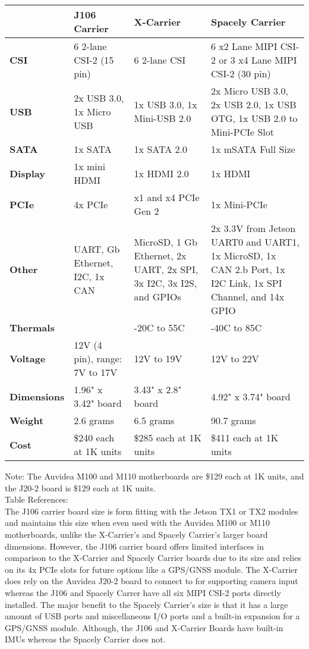 \documentclass[letterpaper,10pt,serif,draftclsnofoot,onecolumn,compsoc,titlepage]{IEEEtran}
\begin{document}
\begin{tabular}{|l|p{5cm}|p{5cm}|p{5cm}|}
	\hline
	\textbf{} & \textbf{J106 Carrier} & \textbf{X-Carrier} & \textbf{Spacely Carrier}\\
	\hline
	\textbf{CSI} & 6 2-lane CSI-2 (15 pin) & 6 2-lane CSI & 6 x2 Lane MIPI CSI-2 or 3 x4 Lane MIPI CSI-2 (30 pin)\\
	\hline
	\textbf{USB} & 2x USB 3.0, 1x Micro USB & 1x USB 3.0, 1x Mini-USB 2.0 & 2x Micro USB 3.0, 2x USB 2.0, 1x USB OTG, 1x USB 2.0 to Mini-PCIe Slot \\
	\hline
	\textbf{SATA} & 1x SATA & 1x SATA 2.0 & 1x mSATA Full Size \\
	\hline
	\textbf{Display} & 1x mini HDMI & 1x HDMI 2.0 & 1x HDMI \\
	\hline
	\textbf{PCIe} & 4x PCIe & x1 and x4 PCIe Gen 2 & 1x Mini-PCIe \\
	\hline
	\textbf{Other} & UART, Gb Ethernet, I2C, 1x CAN & MicroSD, 1 Gb Ethernet, 2x UART, 2x SPI, 3x I2C, 3x I2S, and GPIOs & 2x 3.3V from Jetson UART0 and UART1, 1x MicroSD, 1x CAN 2.b Port, 1x I2C Link, 1x SPI Channel, and 14x GPIO \\
	\hline
	\textbf{Thermals} &  & -20\degree C to 55\degree C & -40\degree C to 85\degree C \\
	\hline
	\textbf{Voltage} & 12V (4 pin), range: 7V to 17V & 12V to 19V & 12V to 22V \\
	\hline
	\textbf{Dimensions} & 1.96" x 3.42" board & 3.43" x 2.8" board & 4.92" x 3.74" board \\
	\hline
	\textbf{Weight} & 2.6 grams & 6.5 grams & 90.7 grams \\
	\hline
	\textbf{Cost} & \$240 each at 1K units & \$285 each at 1K units & \$411 each at 1K units \\
	\hline
\end{tabular}	
\newline
\newline
\newline
Note: The Auvidea M100 and M110 motherboards are \$129 each at 1K units, and the 
J20-2 board is \$129 each at 1K units. \\
Table References: \cite{AuvideaJ106, MouserJ106, CEIX, CEIXpdf, SpacelyUG, SpacelyQuote, CEIQuote, AuvideaQuote}\\

The J106 carrier board size is form fitting with the Jetson TX1 or TX2 modules and 
maintains this size when even used with the Auvidea M100 or M110 motherboards, unlike 
the X-Carrier's and Spacely Carrier's larger board dimensions. However, the J106 carrier board 
offers limited interfaces in comparison to the X-Carrier and Spacely Carrier boards due 
to its size and relies on its 4x PCIe slots for future options like a GPS/GNSS module. The 
X-Carrier does rely on the Auvidea J20-2 board to connect to for supporting  
camera input whereas the J106 and Spacely Carrer have all six MIPI CSI-2 ports directly 
installed. The major benefit to the Spacely Carrier's size is that it has a large 
amount of USB ports and miscellaneous I/O ports and a built-in expansion for a 
GPS/GNSS module. Although, the J106 and X-Carrier Boards have built-in IMUs whereas the 
Spacely Carrier does not.\\
\end{document}
